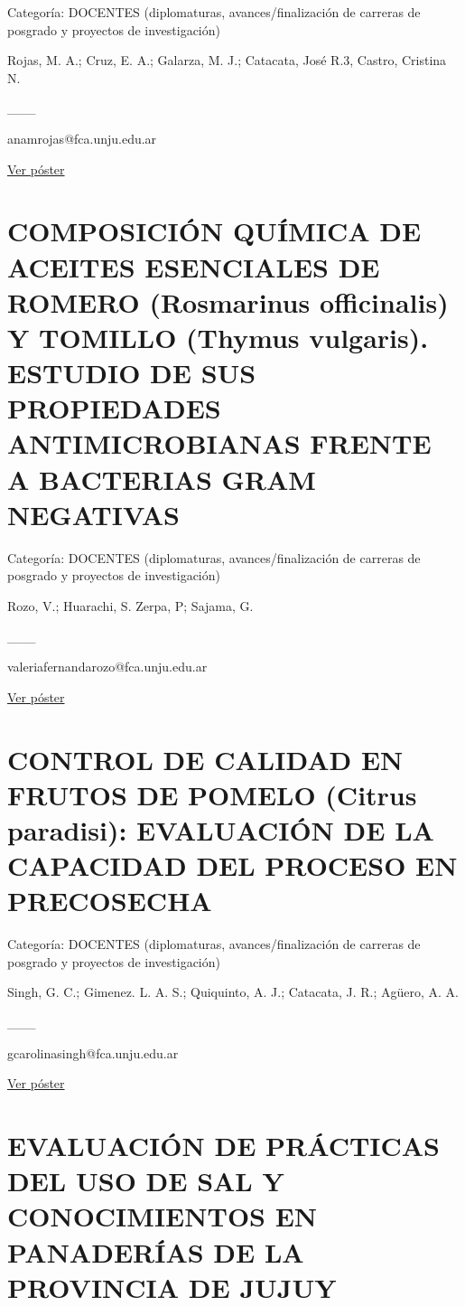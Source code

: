 \documentclass[
  spanish,
  letterpaper,
  DIV=11,
  numbers=noendperiod]{scrreprt}
\begin{document}
Categoría: DOCENTES (diplomaturas, avances/finalización de carreras de
posgrado y proyectos de investigación)

Rojas, M. A.; Cruz, E. A.; Galarza, M. J.; Catacata, José R.3, Castro,
Cristina N.

\_\_\_

anamrojas@fca.unju.edu.ar

\href{https://drive.google.com/open?id=1vckoyx9mN1pyy8tln6Y_HbXaWURezZrk}{Ver
póster}

\section{COMPOSICIÓN QUÍMICA DE ACEITES ESENCIALES DE ROMERO (Rosmarinus
officinalis) Y TOMILLO (Thymus vulgaris). ESTUDIO DE SUS PROPIEDADES
ANTIMICROBIANAS FRENTE A BACTERIAS GRAM
NEGATIVAS}\label{composiciuxf3n-quuxedmica-de-aceites-esenciales-de-romero-rosmarinus-officinalis-y-tomillo-thymus-vulgaris.-estudio-de-sus-propiedades-antimicrobianas-frente-a-bacterias-gram-negativas}

Categoría: DOCENTES (diplomaturas, avances/finalización de carreras de
posgrado y proyectos de investigación)

Rozo, V.; Huarachi, S. Zerpa, P; Sajama, G.

\_\_\_

valeriafernandarozo@fca.unju.edu.ar

\href{https://drive.google.com/open?id=1EUAGIY8pYx5fZA2uH0Rj7kgYj0eTcdZD}{Ver
póster}

\section{CONTROL DE CALIDAD EN FRUTOS DE POMELO (Citrus paradisi):
EVALUACIÓN DE LA CAPACIDAD DEL PROCESO EN
PRECOSECHA}\label{control-de-calidad-en-frutos-de-pomelo-citrus-paradisi-evaluaciuxf3n-de-la-capacidad-del-proceso-en-precosecha}

Categoría: DOCENTES (diplomaturas, avances/finalización de carreras de
posgrado y proyectos de investigación)

Singh, G. C.; Gimenez. L. A. S.; Quiquinto, A. J.; Catacata, J. R.;
Agüero, A. A.

\_\_\_

gcarolinasingh@fca.unju.edu.ar

\href{https://drive.google.com/open?id=1P_eTFUsxCbx4urUD0X_7HXdtCdDSCz8k}{Ver
póster}

\section{EVALUACIÓN DE PRÁCTICAS DEL USO DE SAL Y CONOCIMIENTOS EN
PANADERÍAS DE LA PROVINCIA DE
JUJUY}\label{evaluaciuxf3n-de-pruxe1cticas-del-uso-de-sal-y-conocimientos-en-panaderuxedas-de-la-provincia-de-jujuy}
\end{document}
